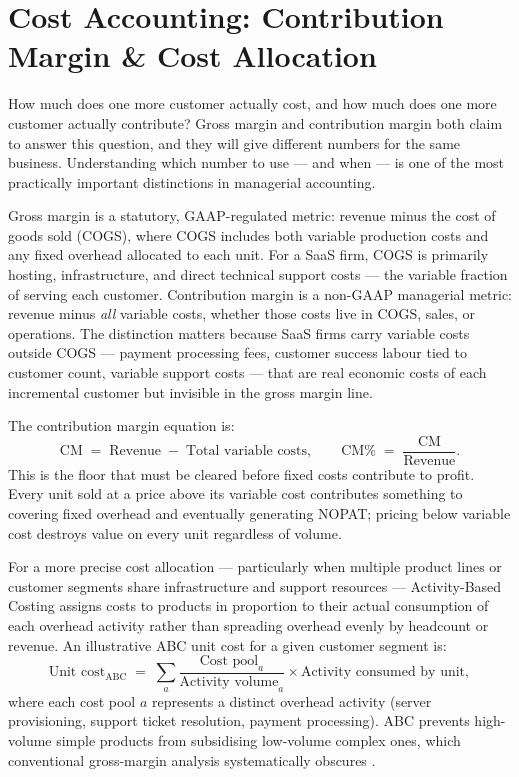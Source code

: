 \section{Cost Accounting: Contribution Margin \& Cost Allocation}\label{sec:cost-accounting}

How much does one more customer actually cost, and how much does one more customer actually
contribute? Gross margin and contribution margin both claim to answer this question, and they
will give different numbers for the same business. Understanding which number to use --- and
when --- is one of the most practically important distinctions in managerial accounting.

Gross margin is a statutory, GAAP-regulated metric: revenue minus the cost of goods sold
(COGS), where COGS includes both variable production costs and any fixed overhead allocated
to each unit. For a SaaS firm, COGS is primarily hosting, infrastructure, and direct
technical support costs --- the variable fraction of serving each customer. Contribution
margin is a non-GAAP managerial metric: revenue minus \emph{all} variable costs, whether
those costs live in COGS, sales, or operations. The distinction matters because SaaS firms
carry variable costs outside COGS --- payment processing fees, customer success labour tied
to customer count, variable support costs --- that are real economic costs of each incremental
customer but invisible in the gross margin line.

The contribution margin equation is:
\begin{equation}\label{eq:contribution-margin}
  \mathrm{CM} \;=\; \text{Revenue} \;-\; \text{Total variable costs},
  \qquad
  \mathrm{CM\%} \;=\; \frac{\mathrm{CM}}{\text{Revenue}}.
\end{equation}
This is the floor that must be cleared before fixed costs contribute to profit. Every unit
sold at a price above its variable cost contributes something to covering fixed overhead and
eventually generating NOPAT; pricing below variable cost destroys value on every unit regardless
of volume.

For a more precise cost allocation --- particularly when multiple product lines or customer
segments share infrastructure and support resources --- Activity-Based Costing assigns costs
to products in proportion to their actual consumption of each overhead activity rather than
spreading overhead evenly by headcount or revenue. An illustrative ABC unit cost for a given
customer segment is:
\begin{equation}\label{eq:abc-cost}
  \text{Unit cost}_{\text{ABC}} \;=\; \sum_{a} \frac{\text{Cost pool}_a}{\text{Activity volume}_a} \times \text{Activity consumed by unit},
\end{equation}
where each cost pool \(a\) represents a distinct overhead activity (server provisioning,
support ticket resolution, payment processing). ABC prevents high-volume simple products from
subsidising low-volume complex ones, which conventional gross-margin analysis systematically
obscures \parencite{datar2025horngrens}.

